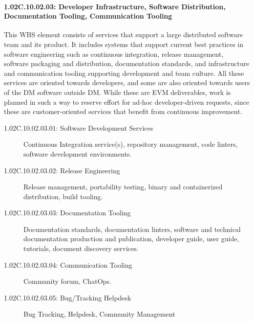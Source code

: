\paragraph*{1.02C.10.02.03: Developer Infrastructure, Software Distribution, Documentation Tooling, Communication Tooling}

This WBS element consists of services that support a large distributed
software team and its product. It includes systems that support current
best practices in software engineering such as continuous integration,
release management, software packaging and distribution, documentation
standards, and infrastructure and communication tooling supporting
development and team culture. All these services are oriented towards
developers, and some are also oriented towards users of the DM software
outside DM. While these are EVM deliverables, work is planned in such a
way to reserve effort for ad-hoc developer-driven requests, since these
are customer-oriented services that benefit from continuous improvement.

\begin{description}

\item[1.02C.10.02.03.01: Software Development Services]
  Continuous Integration service(s), repository management, code linters,
  software development environments.

\item[1.02C.10.02.03.02: Release Engineering]
  Release management, portability testing, binary and containerized
  distribution, build tooling.

\item[1.02C.10.02.03.03: Documentation Tooling]
  Documentation standards, documentation linters, software and technical
  documentation production and publication, developer guide, user guide,
  tutorials, document discovery services.

\item[1.02C.10.02.03.04: Communication Tooling]
  Community forum, ChatOps.

\item[1.02C.10.02.03.05: Bug/Tracking Helpdesk]
  Bug Tracking, Helpdesk, Community Management

\end{description}
